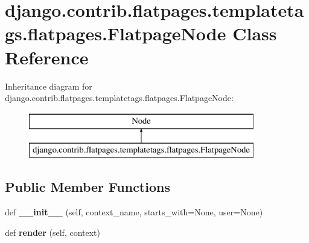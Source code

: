 \hypertarget{classdjango_1_1contrib_1_1flatpages_1_1templatetags_1_1flatpages_1_1_flatpage_node}{}\section{django.\+contrib.\+flatpages.\+templatetags.\+flatpages.\+Flatpage\+Node Class Reference}
\label{classdjango_1_1contrib_1_1flatpages_1_1templatetags_1_1flatpages_1_1_flatpage_node}
Inheritance diagram for django.\+contrib.\+flatpages.\+templatetags.\+flatpages.\+Flatpage\+Node\+:\begin{figure}[H]
\begin{center}
\leavevmode
\includegraphics[height=2.000000cm]{classdjango_1_1contrib_1_1flatpages_1_1templatetags_1_1flatpages_1_1_flatpage_node}
\end{center}
\end{figure}
\subsection*{Public Member Functions}
\begin{DoxyCompactItemize}
\item 
\mbox{\label{classdjango_1_1contrib_1_1flatpages_1_1templatetags_1_1flatpages_1_1_flatpage_node_a6e4bca76755278ae88eefe2910e3c064}} 
def {\bfseries \+\_\+\+\_\+init\+\_\+\+\_\+} (self, context\+\_\+name, starts\+\_\+with=None, user=None)
\item 
\mbox{\label{classdjango_1_1contrib_1_1flatpages_1_1templatetags_1_1flatpages_1_1_flatpage_node_af7b724a7d3016fd8c7e6ad1e187f5d47}} 
def {\bfseries render} (self, context)
\end{DoxyCompactItemize}

